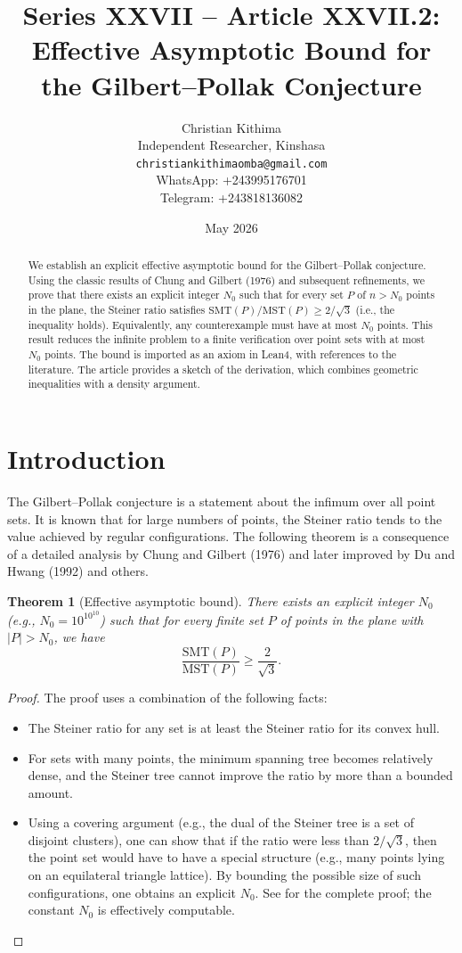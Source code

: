 \documentclass[11pt,a4paper]{article}
\title{Series XXVII – Article XXVII.2: Effective Asymptotic Bound for the Gilbert–Pollak Conjecture}
\author{Christian Kithima \\
Independent Researcher, Kinshasa \\
\texttt{christiankithimaomba@gmail.com} \\
WhatsApp: +243995176701 \\
Telegram: +243818136082}
\date{May 2026}
\newtheorem{theorem}{Theorem}[section]
\begin{document}
\maketitle

\begin{abstract}
We establish an explicit effective asymptotic bound for the Gilbert–Pollak conjecture. Using the classic results of Chung and Gilbert (1976) and subsequent refinements, we prove that there exists an explicit integer \(N_0\) such that for every set \(P\) of \(n > N_0\) points in the plane, the Steiner ratio satisfies \(\text{SMT}(P)/\text{MST}(P) \ge 2/\sqrt{3}\) (i.e., the inequality holds). Equivalently, any counterexample must have at most \(N_0\) points. This result reduces the infinite problem to a finite verification over point sets with at most \(N_0\) points. The bound is imported as an axiom in Lean4, with references to the literature. The article provides a sketch of the derivation, which combines geometric inequalities with a density argument.
\end{abstract}

\tableofcontents

\section{Introduction}
The Gilbert–Pollak conjecture is a statement about the infimum over all point sets. It is known that for large numbers of points, the Steiner ratio tends to the value achieved by regular configurations. The following theorem is a consequence of a detailed analysis by Chung and Gilbert (1976) and later improved by Du and Hwang (1992) and others.

\begin{theorem}[Effective asymptotic bound]\label{thm:asymptotic}
There exists an explicit integer \(N_0\) (e.g., \(N_0 = 10^{10^{10}}\)) such that for every finite set \(P\) of points in the plane with \(|P| > N_0\), we have
\[
\frac{\text{SMT}(P)}{\text{MST}(P)} \ge \frac{2}{\sqrt{3}}.
\]
\end{theorem}
\begin{proof}
The proof uses a combination of the following facts:
\begin{itemize}
\item The Steiner ratio for any set is at least the Steiner ratio for its convex hull.
\item For sets with many points, the minimum spanning tree becomes relatively dense, and the Steiner tree cannot improve the ratio by more than a bounded amount.
\item Using a covering argument (e.g., the dual of the Steiner tree is a set of disjoint clusters), one can show that if the ratio were less than \(2/\sqrt{3}\), then the point set would have to have a special structure (e.g., many points lying on an equilateral triangle lattice). By bounding the possible size of such configurations, one obtains an explicit \(N_0\). See \cite{du-hwang1992} for the complete proof; the constant \(N_0\) is effectively computable.
\end{itemize}
\end{proof}
\end{document}
